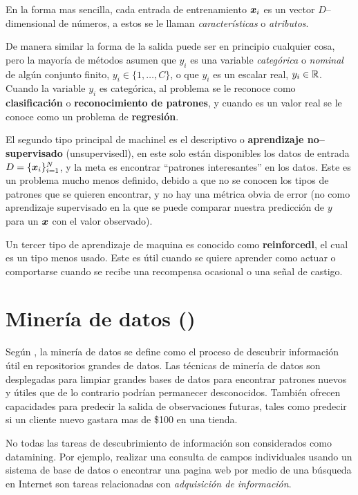 En la forma mas sencilla, cada entrada de entrenamiento ${\bm{x}}_i$ es un vector $D$--dimensional de números, a estos se le llaman \emph{características} o \emph{atributos}.

De manera similar la forma de la salida puede ser en principio cualquier cosa, pero la mayoría de métodos asumen que $y_i$ es una variable \emph{categórica} o \emph{nominal} de algún conjunto finito, $y_i \in \{1,\ldots,C\}$, o que $y_i$ es un escalar real, $y_i \in \mathbb{R}$. Cuando la variable $y_i$ es categórica, al problema se le reconoce como \textbf{clasificación} o \textbf{reconocimiento de patrones}, y cuando es un valor real se le conoce como un problema de \textbf{regresión}.

El segundo tipo principal de \gls{machinel} es el descriptivo o \textbf{aprendizaje no--supervisado} (\gls{unsupervisedl}), en este solo están disponibles los datos de entrada $D = \{{\bm{x}}_i\}_{i=1}^{N}$, y la meta es encontrar ``patrones interesantes'' en los datos. Este es un problema mucho menos definido, debido a que no se conocen los tipos de patrones que se quieren encontrar, y no hay una métrica obvia de error (no como aprendizaje supervisado en la que se puede comparar nuestra predicción de $y$ para un ${\bm{x}}$ con el valor observado).

Un tercer tipo de aprendizaje de maquina es conocido como \textbf{\gls{reinforcedl}}, el cual es un tipo menos usado. Este es útil cuando se quiere aprender como actuar o comportarse cuando se recibe una recompensa ocasional o una señal de castigo.

\section{Minería de datos ()} \label{sec:datamining}
Según \cite{tan2005introduction}, la minería de datos se define como el proceso de descubrir información útil en repositorios grandes de datos. Las técnicas de minería de datos son desplegadas para limpiar grandes bases de datos para encontrar patrones nuevos y útiles que de lo contrario podrían permanecer desconocidos. También ofrecen capacidades para predecir la salida de observaciones futuras, tales como predecir si un cliente nuevo gastara mas de \$100 en una tienda.

No todas las tareas de descubrimiento de información son considerados como \gls{datamining}. Por ejemplo, realizar una consulta de campos individuales usando un sistema de base de datos o encontrar una pagina web por medio de una búsqueda en Internet son tareas relacionadas con \emph{adquisición de información}.


